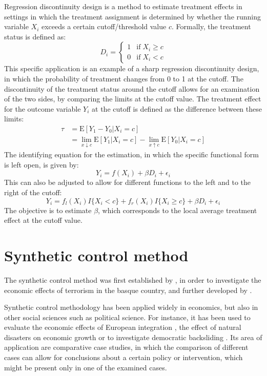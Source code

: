 \documentclass{scrbook}
\begin{document}
Regression discontinuity design is a method to estimate treatment
effects in settings in which the treatment assignment is determined by
whether the running variable \(X_{i}\) exceeds a certain
cutoff/threshold value \(c\). Formally, the treatment status is defined
as: \begin{equation}
D_{i} = \begin{cases}
1 & \text{if}\; X_{i} \geq c \\
0 & \text{if}\; X_{i} < c
\end{cases}
\end{equation} This specific application is an example of a sharp
regression discontinuity design, in which the probability of treatment
changes from 0 to 1 at the cutoff. The discontinuity of the treatment
status around the cutoff allows for an examination of the two sides, by
comparing the limits at the cutoff value. The treatment effect for the
outcome variable \(Y_{i}\) at the cutoff is defined as the difference
between these limits: \begin{align}    
\tau & =\text{E}[Y_{1}-Y_{0}\vert X_{i}=c] \\
     & =\lim_{x\downarrow c} \text{E}[Y_{1}\vert X_{i}=c]-\lim_{x\uparrow c} \text{E}[Y_{0}\vert X_{i}=c] \nonumber
\end{align} \noindent The identifying equation for the estimation, in
which the specific functional form is left open, is given by:
\begin{equation}
Y_{i}=f(X_{i})+\beta D_{i}+\epsilon_{i}
\end{equation} This can also be adjusted to allow for different
functions to the left and to the right of the cutoff: \begin{equation}
Y_{i}=f_{l}(X_{i})I\{X_{i}<c\}+f_{r}(X_{i})I\{X_{i}\geq c\}+\beta D_{i}+\epsilon_{i}
\end{equation} The objective is to estimate \(\beta\), which corresponds
to the local average treatment effect at the cutoff value.

\section{Synthetic control method}

The synthetic control method was first established by
\textcite{abadie_economic_2003}, in order to investigate the economic
effects of terrorism in the basque country, and further developed by
\textcite{abadie_synthetic_2010}.

Synthetic control methodology has been applied widely in economics, but
also in other social sciences such as political science. For instance,
it has been used to evaluate the economic effects of European
integration \parencite{campos_institutional_2019}, the effect of natural
disasters on economic growth \parencite{cavallo_catastrophic_2013} or to
investigate democratic backsliding
\parencite{meyerrose_unintended_2020}. Its area of application are
comparative case studies, in which the comparison of different cases can
allow for conclusions about a certain policy or intervention, which
might be present only in one of the examined cases.
\end{document}
